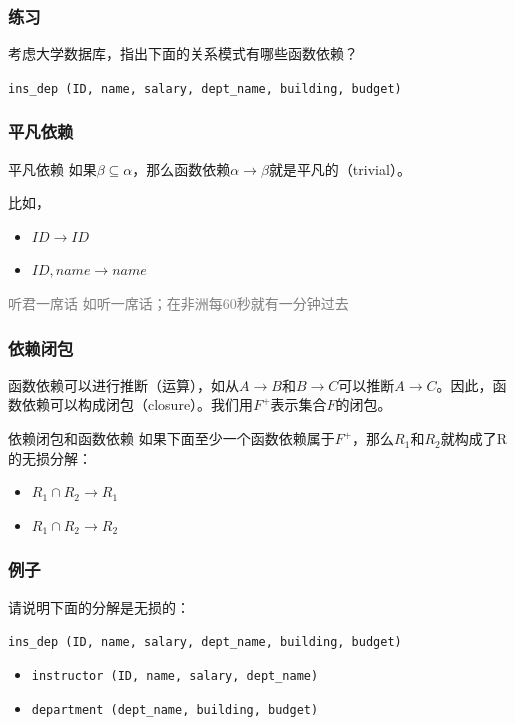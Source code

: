 \documentclass[aspectratio=169, 14pt]{beamer}
\begin{document}
\begin{frame}
    \frametitle{练习}
考虑大学数据库，指出下面的关系模式有哪些函数依赖？

\texttt{ins\_dep (ID, name, salary, dept\_name, building, budget)
}

\end{frame}

\begin{frame}
    \frametitle{平凡依赖}
\begin{exampleblock}{平凡依赖}
如果$\beta \subseteq \alpha$，那么函数依赖$\alpha \rightarrow \beta$就是\alert{平凡的}（trivial）。    
\end{exampleblock}

比如，
\begin{itemize}
    \item $ID \rightarrow ID$
    \item $ID, name \rightarrow name$
\end{itemize}

\textcolor{gray}{听君一席话 如听一席话；在非洲每60秒就有一分钟过去}
\end{frame}

\begin{frame}
    \frametitle{依赖闭包}
函数依赖可以进行推断（运算），如从$A \rightarrow B$和$B \rightarrow C$可以推断$A \rightarrow C$。因此，函数依赖可以构成\alert{闭包}（closure）。我们用$F^+$表示集合$F$的闭包。

\pause
\begin{exampleblock}{依赖闭包和函数依赖}
如果下面至少一个函数依赖属于$F^+$，那么$R_1$和$R_2$就构成了R的无损分解：

\begin{itemize}
    \item $R_1 \cap R_2 \rightarrow R_1$
    \item $R_1 \cap R_2 \rightarrow R_2$
\end{itemize}
\end{exampleblock}

\end{frame}

\begin{frame}
    \frametitle{例子}
请说明下面的分解是无损的：

\texttt{ins\_dep (ID, name, salary, dept\_name, building, budget)
}

\begin{itemize}
    \item \texttt{instructor (ID, name, salary, dept\_name)    }
    \item \texttt{department (dept\_name, building, budget)}
\end{itemize}
    

\end{frame}
\end{document}
